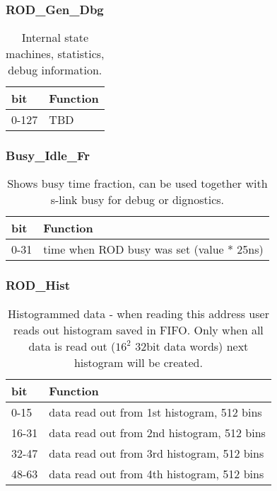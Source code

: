 \subsubsection{ROD\_Gen\_Dbg}
\begin {table}[H]
\begin{center}
\begin{tabular}{|l|l|}
\hline
\textbf{bit} & \textbf{Function} \\
\hline
0-127 & TBD \\
\hline
\end{tabular}
\caption{Internal state machines, statistics, debug information.}
\end{center}
\end{table}

\subsubsection{Busy\_Idle\_Fr}
\begin {table}[H]
\begin{center}
\begin{tabular}{|l|l|}
\hline
\textbf{bit} & \textbf{Function} \\
\hline
0-31 & time when ROD busy was set (value * 25ns)  \\
\hline
\end{tabular}
\caption{Shows busy time fraction, can be used together with s-link busy for debug or dignostics.}
\end{center}
\end{table}

\subsubsection{ROD\_Hist}
\begin {table}[H]
\begin{center}
\begin{tabular}{|l|l|}
\hline
\textbf{bit} & \textbf{Function} \\
\hline
0-15 & data read out from 1st histogram, 512 bins\\ \hline
16-31 & data read out from 2nd histogram, 512 bins\\ \hline
32-47 & data read out from 3rd histogram, 512 bins\\ \hline
48-63 & data read out from 4th histogram, 512 bins\\ \hline
\end{tabular}
\caption{Histogrammed data - when reading this address user reads out histogram saved in FIFO. Only when all data is read out ($16^2$ 32bit data words) next histogram will be created.}
\end{center}
\end{table}

